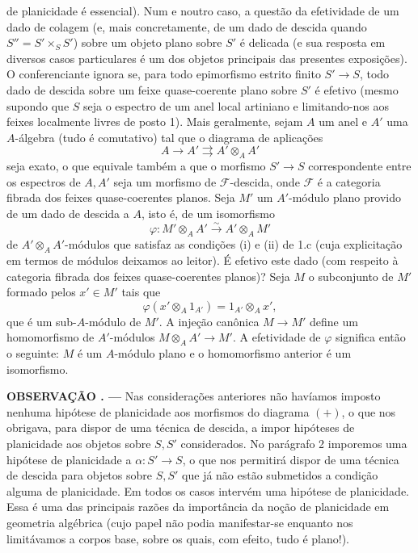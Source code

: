 \documentclass[11pt,twoside,openany]{book}
\numberwithin{equation}{section}
\newcommand{\src}[1]{%
  \phantomsection\hypertarget{src:#1}{}%
  \marginpar{\raggedleft\footnotesize\sffamily #1}%
}
\theoremstyle{plain}
\theoremstyle{definition}
\theoremstyle{remark}
\newcommand{\result}[2]{%
  \par\medskip\noindent\textbf{#1%
  \if\relax\detokenize{#2}\relax\else\space#2\fi. ---}\enspace
}
\newcommand{\FgaUnitKey}{frontmatter}
\renewcommand{\src}[1]{%
  \phantomsection\hypertarget{src:\FgaUnitKey:#1}{}%
  \marginpar{\raggedleft\footnotesize\sffamily #1}%
}
\begin{document}
\src{307}
de planicidade é essencial). Num e noutro caso, a questão da efetividade de
um dado de colagem (e, mais concretamente, de um dado de descida quando
$S''=S'\times_SS'$) sobre um objeto plano sobre $S'$ é delicada (e sua
resposta em diversos casos particulares é um dos objetos principais das
presentes exposições). O conferenciante ignora se, para todo epimorfismo
estrito finito $S'\longrightarrow S$, todo dado de descida sobre um feixe
quase-coerente plano sobre $S'$ é efetivo (mesmo supondo que $S$ seja o
espectro de um anel local artiniano e limitando-nos aos feixes localmente
livres de posto 1). Mais geralmente, sejam $A$ um anel e $A'$ uma
$A$-álgebra (tudo é comutativo) tal que o diagrama de aplicações
\[
  A\longrightarrow A'\rightrightarrows A'\otimes_AA'
\]
seja exato, o que equivale também a que o morfismo
$S'\longrightarrow S$ correspondente entre os espectros de $A,A'$ seja um
morfismo de $\mathcal F$-descida, onde $\mathcal F$ é a categoria fibrada
dos feixes quase-coerentes planos. Seja $M'$ um $A'$-módulo plano provido de
um dado de descida a $A$, isto é, de um isomorfismo
\[
  \varphi:M'\otimes_AA'\xrightarrow{\sim}A'\otimes_AM'
\]
de $A'\otimes_AA'$-módulos que satisfaz as condições (i) e (ii) de 1.c
(cuja explicitação em termos de módulos deixamos ao leitor). É efetivo
este dado (com respeito à categoria fibrada dos feixes quase-coerentes
planos)? Seja $M$ o subconjunto de $M'$ formado pelos $x'\in M'$ tais que
\[
  \varphi(x'\otimes_A1_{A'})=1_{A'}\otimes_Ax',
\]
que é um sub-$A$-módulo de $M'$. A injeção canônica
$M\longrightarrow M'$ define um homomorfismo de $A'$-módulos
$M\otimes_AA'\longrightarrow M'$. A efetividade de $\varphi$ significa
então o seguinte: $M$ é um $A$-módulo plano e o homomorfismo anterior é
um isomorfismo.

\result{OBSERVAÇÃO}{} Nas considerações anteriores não havíamos imposto
nenhuma hipótese de planicidade aos morfismos do diagrama $(+)$, o que nos
obrigava, para dispor de uma técnica de descida, a impor hipóteses de
planicidade aos objetos sobre $S,S'$ considerados. No parágrafo 2 imporemos
uma hipótese de planicidade a $\alpha:S'\longrightarrow S$, o que nos permitirá
dispor de uma técnica de descida para objetos sobre $S,S'$ que já não estão
submetidos a condição alguma de planicidade. Em todos os casos intervém uma
hipótese de planicidade. Essa é uma das principais razões da importância da
noção de planicidade em geometria algébrica (cujo papel não podia manifestar-se
enquanto nos limitávamos a corpos base, sobre os quais, com efeito, tudo é
plano!).
\end{document}
